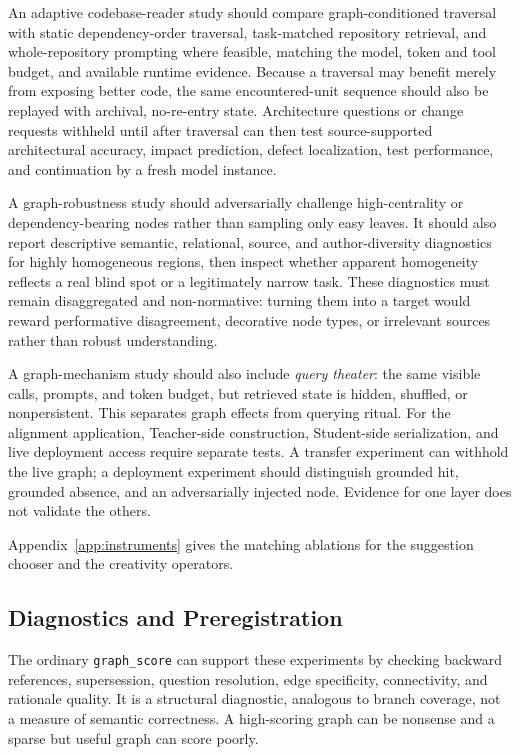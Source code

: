 An adaptive codebase-reader study should compare graph-conditioned traversal with static dependency-order traversal, task-matched repository retrieval, and whole-repository prompting where feasible, matching the model, token and tool budget, and available runtime evidence. Because a traversal may benefit merely from exposing better code, the same encountered-unit sequence should also be replayed with archival, no-re-entry state. Architecture questions or change requests withheld until after traversal can then test source-supported architectural accuracy, impact prediction, defect localization, test performance, and continuation by a fresh model instance.

A graph-robustness study should adversarially challenge high-centrality or dependency-bearing nodes rather than sampling only easy leaves. It should also report descriptive semantic, relational, source, and author-diversity diagnostics for highly homogeneous regions, then inspect whether apparent homogeneity reflects a real blind spot or a legitimately narrow task. These diagnostics must remain disaggregated and non-normative: turning them into a target would reward performative disagreement, decorative node types, or irrelevant sources rather than robust understanding.

A graph-mechanism study should also include \emph{query theater}: the same visible calls, prompts, and token budget, but retrieved state is hidden, shuffled, or nonpersistent. This separates graph effects from querying ritual. For the alignment application, Teacher-side construction, Student-side serialization, and live deployment access require separate tests. A transfer experiment can withhold the live graph; a deployment experiment should distinguish grounded hit, grounded absence, and an adversarially injected node. Evidence for one layer does not validate the others.

Appendix~\ref{app:instruments} gives the matching ablations for the suggestion chooser and the creativity operators.

\subsection{Diagnostics and Preregistration}

The ordinary \texttt{graph\_score} can support these experiments by checking backward references, supersession, question resolution, edge specificity, connectivity, and rationale quality. It is a structural diagnostic, analogous to branch coverage, not a measure of semantic correctness. A high-scoring graph can be nonsense and a sparse but useful graph can score poorly.

